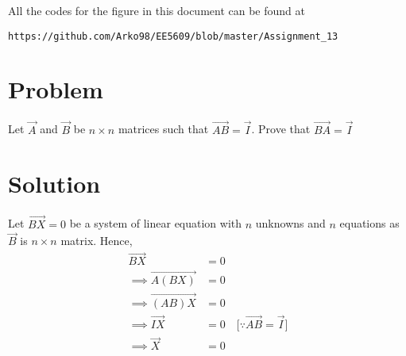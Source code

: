 \documentclass[journal,12pt,twocolumn]{IEEEtran}
\begin{document}
All the codes for the figure in this document can be found at
\begin{lstlisting}
https://github.com/Arko98/EE5609/blob/master/Assignment_13
\end{lstlisting}

\section{\textbf{Problem}}
Let $\vec{A}$ and $\vec{B}$ be $n \times n$ matrices such that $\vec{AB}=\vec{I}$. Prove that $\vec{BA}=\vec{I}$
\section{\textbf{Solution}}
\begin{comment}
\subsection{Solution 1}
Since $\vec{AB} = \vec{I}$, hence $\vec{AB}$ has range equal to the full $n$ - dimensional space. Hence the range of $\vec{B}$ is also $n$ - dimensional space. If $\vec{B}$ did not have $n$ - dimensional space as it's range then a set of $(n-1)$ vectors would span the range of $\vec{B}$, so the range of $\vec{AB}$, which is the image under $\vec{A}$ of the range of $\vec{B}$, would also be spanned by a set of $(n-1)$ vectors, hence would have dimension less than $n$. Hence we can write,
\begin{align}
\vec{B} &=\vec{BI}\\
&=\vec{B(AB)} \quad{\text{[$\because \vec{AB} = \vec{I}$]}}\\
&=\vec{(BA)B} \label{eq1}
\intertext{Hence from \eqref{eq1},}
\vec{B}-\vec{(BA)B} &= \vec{0}\\
\vec{(I-BA)B} &= \vec{0} \quad{\text{[Distributive Law]}}\label{eq2}\\
\intertext{Since range of $\vec{B}$ is $n$ - dimensional space hence $\vec{B}\not=\vec{0}$. Thus we can write from \eqref{eq2},}
\vec{I-BA} &= \vec{0}\\
\vec{BA} &= \vec{I}
\end{align}
Hence Proved.
\end{comment}
Let $\vec{BX}=0$ be a system of linear equation with $n$ unknowns and $n$ equations as $\vec{B}$ is $n \times n$ matrix. Hence,
\begin{align}
\vec{BX}&=0 \label{eqMain}\\
\implies\vec{A(BX)} &= 0\\
\implies\vec{(AB)X} &= 0\\
\implies\vec{IX} &= 0 \quad{\text{[$\because \vec{AB} = \vec{I}$]}}\\
\implies\vec{X} &= 0\label{independent}
\end{align}
\end{document}

